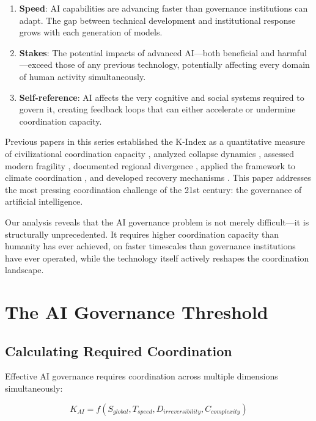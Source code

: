 \documentclass[11pt,letterpaper]{article}
\newcommand{\Kai}{K_{AI}}
\begin{document}
\begin{enumerate}
\item \textbf{Speed}: AI capabilities are advancing faster than governance institutions can adapt. The gap between technical development and institutional response grows with each generation of models.

\item \textbf{Stakes}: The potential impacts of advanced AI---both beneficial and harmful---exceed those of any previous technology, potentially affecting every domain of human activity simultaneously.

\item \textbf{Self-reference}: AI affects the very cognitive and social systems required to govern it, creating feedback loops that can either accelerate or undermine coordination capacity.
\end{enumerate}

Previous papers in this series established the K-Index as a quantitative measure of civilizational coordination capacity \citep{Paper1}, analyzed collapse dynamics \citep{Paper2}, assessed modern fragility \citep{Paper3}, documented regional divergence \citep{Paper4}, applied the framework to climate coordination \citep{Paper5}, and developed recovery mechanisms \citep{Paper6}. This paper addresses the most pressing coordination challenge of the 21st century: the governance of artificial intelligence.

Our analysis reveals that the AI governance problem is not merely difficult---it is structurally unprecedented. It requires higher coordination capacity than humanity has ever achieved, on faster timescales than governance institutions have ever operated, while the technology itself actively reshapes the coordination landscape.

\section{The AI Governance Threshold}

\subsection{Calculating Required Coordination}

Effective AI governance requires coordination across multiple dimensions simultaneously:

\begin{equation}
\Kai = f(S_{global}, T_{speed}, D_{irreversibility}, C_{complexity})
\label{eq:k_ai}
\end{equation}
\end{document}
